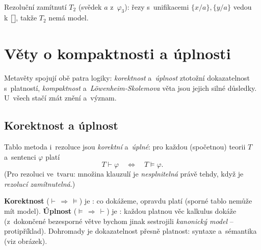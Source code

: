 \documentclass[11pt,a4paper]{article}
\newcommand{\eclause}{\mathord{\text{\framebox[1.25ex][c]{\rule{0pt}{0.95ex}}}}}
\begin{document}
\begin{priklad}
\smallskip
\begin{center}
\\[0.3mm]
{\footnotesize Rezoluční zamítnutí $T_2$ (svědek $a$ z~$\varphi_3$): řezy s~unifikacemi $\{x/a\},\{y/a\}$ vedou k~$\eclause$, takže $T_2$ nemá model.}
\end{center}
\end{priklad}

\section{Věty o kompaktnosti a úplnosti}

Metavěty spojují obě patra logiky: \emph{korektnost} a~\emph{úplnost} ztotožní dokazatelnost s~platností, \emph{kompaktnost} a~\emph{Löwenheim-Skolemova} věta jsou jejich silné důsledky. U~všech stačí znát znění a~význam.

\subsection{Korektnost a úplnost}

\begin{veta}
Tablo metoda i~rezoluce jsou \emph{korektní} a~\emph{úplné}: pro každou (spočetnou) teorii $T$ a~sentenci $\varphi$ platí
\[
T\vdash\varphi\quad\Longleftrightarrow\quad T\models\varphi.
\]
(Pro rezoluci ve~tvaru: množina klauzulí je \emph{nesplnitelná} právě tehdy, když je \emph{rezolucí zamítnutelná}.)
\end{veta}

\begin{intuice}
\textbf{Korektnost} ($\vdash\,\Rightarrow\,\models$) je : co dokážeme, opravdu platí (sporné tablo nemůže mít model). \textbf{Úplnost} ($\models\,\Rightarrow\,\vdash$) je : každou platnou věc kalkulus dokáže (z~dokončené bezesporné větve bychom jinak sestrojili \emph{kanonický model} -- protipříklad). Dohromady je dokazatelnost přesně platnost: syntaxe a~sémantika  (viz obrázek).
\end{intuice}
\end{document}
